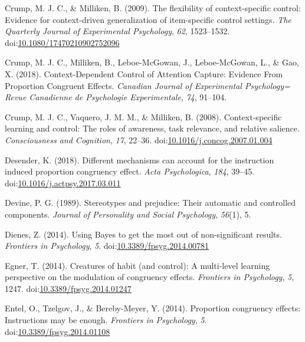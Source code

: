 \documentclass[english,,man,floatsintext]{apa6}
\begin{document}
\leavevmode\hypertarget{ref-crump_flexibility_2009}{}%
Crump, M. J. C., \& Milliken, B. (2009). The flexibility of context-specific control: Evidence for context-driven generalization of item-specific control settings. \emph{The Quarterly Journal of Experimental Psychology}, \emph{62}, 1523--1532. doi:\href{https://doi.org/10.1080/17470210902752096}{10.1080/17470210902752096}

\leavevmode\hypertarget{ref-crump_context-dependent_2018}{}%
Crump, M. J. C., Milliken, B., Leboe-McGowan, J., Leboe-McGowan, L., \& Gao, X. (2018). Context-Dependent Control of Attention Capture: Evidence From Proportion Congruent Effects. \emph{Canadian Journal of Experimental Psychology= Revue Canadienne de Psychologie Experimentale}, \emph{74}, 91--104.

\leavevmode\hypertarget{ref-crump_context-specific_2008}{}%
Crump, M. J. C., Vaquero, J. M. M., \& Milliken, B. (2008). Context-specific learning and control: The roles of awareness, task relevance, and relative salience. \emph{Consciousness and Cognition}, \emph{17}, 22--36. doi:\href{https://doi.org/10.1016/j.concog.2007.01.004}{10.1016/j.concog.2007.01.004}

\leavevmode\hypertarget{ref-desender_different_2018}{}%
Desender, K. (2018). Different mechanisms can account for the instruction induced proportion congruency effect. \emph{Acta Psychologica}, \emph{184}, 39--45. doi:\href{https://doi.org/10.1016/j.actpsy.2017.03.011}{10.1016/j.actpsy.2017.03.011}

\leavevmode\hypertarget{ref-devine_stereotypes_1989}{}%
Devine, P. G. (1989). Stereotypes and prejudice: Their automatic and controlled components. \emph{Journal of Personality and Social Psychology}, \emph{56}(1), 5.

\leavevmode\hypertarget{ref-dienes_using_2014}{}%
Dienes, Z. (2014). Using Bayes to get the most out of non-significant results. \emph{Frontiers in Psychology}, \emph{5}. doi:\href{https://doi.org/10.3389/fpsyg.2014.00781}{10.3389/fpsyg.2014.00781}

\leavevmode\hypertarget{ref-egner_creatures_2014}{}%
Egner, T. (2014). Creatures of habit (and control): A multi-level learning perspective on the modulation of congruency effects. \emph{Frontiers in Psychology}, \emph{5}, 1247. doi:\href{https://doi.org/10.3389/fpsyg.2014.01247}{10.3389/fpsyg.2014.01247}

\leavevmode\hypertarget{ref-entel_proportion_2014}{}%
Entel, O., Tzelgov, J., \& Bereby-Meyer, Y. (2014). Proportion congruency effects: Instructions may be enough. \emph{Frontiers in Psychology}, \emph{5}. doi:\href{https://doi.org/10.3389/fpsyg.2014.01108}{10.3389/fpsyg.2014.01108}
\end{document}

